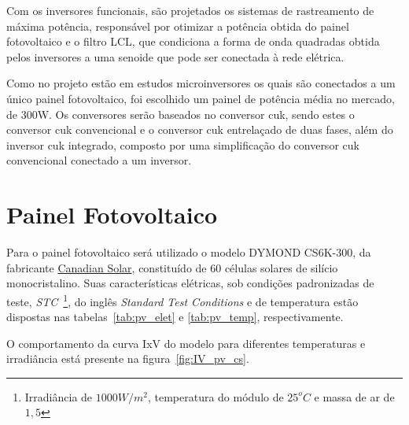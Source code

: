 \documentclass[
	12pt,				%
	openany,
	onseside,
	a4paper,			%
	english,			%
	french,				%
	spanish,			%
	brazil,				%
	]{abntex2}
\begin{document}
Com os inversores funcionais, são projetados os sistemas de rastreamento de máxima potência, responsável por otimizar a potência obtida do painel fotovoltaico e o filtro LCL, que condiciona a forma de onda quadradas obtida pelos inversores a uma senoide que pode ser conectada à rede elétrica.

Como no projeto estão em estudos microinversores os quais são conectados a um único painel fotovoltaico, foi escolhido um painel de potência média no mercado, de 300W. Os conversores serão baseados no conversor cuk, sendo estes o conversor cuk convencional e o conversor cuk entrelaçado de duas fases, além do inversor cuk integrado, composto por uma simplificação do conversor cuk convencional conectado a um inversor.

\section{Painel Fotovoltaico}

Para o painel fotovoltaico será utilizado o modelo DYMOND CS6K-300, da fabricante \href{https://www.canadiansolar.com/en}{Canadian Solar}, constituído de 60 células solares de silício monocristalino. Suas características elétricas, sob condições padronizadas de teste, \emph{STC}~\footnote{\label{foot_:STC} Irradiância de $1000W/m^2$, temperatura do módulo de $25^oC$ e massa de ar de $1,5$}, do inglês \textit{Standard Test Conditions} e de temperatura estão dispostas nas tabelas~\ref{tab:pv_elet} e \ref{tab:pv_temp}, respectivamente.

O comportamento da curva IxV do modelo para diferentes temperaturas e irradiância está presente na figura~\ref{fig:IV_pv_cs}. 
\end{document}
